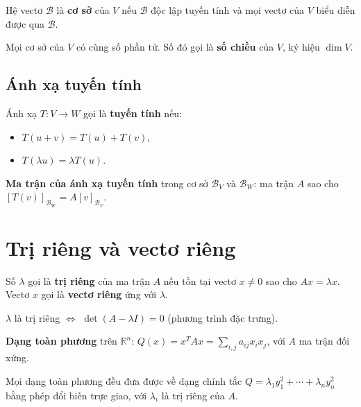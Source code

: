\documentclass[12pt,a4paper]{article}
\begin{document}
\begin{dinhnghia}
  Hệ vectơ $\mathcal{B}$ là \textbf{cơ sở} của $V$ nếu $\mathcal{B}$ độc lập tuyến tính và mọi vectơ của $V$ biểu diễn được qua $\mathcal{B}$.
\end{dinhnghia}

\begin{dinhly}
  Mọi cơ sở của $V$ có cùng số phần tử. Số đó gọi là \textbf{số chiều} của $V$, ký hiệu $\dim V$.
\end{dinhly}

\subsection{Ánh xạ tuyến tính}

\begin{dinhnghia}
  Ánh xạ $T: V \to W$ gọi là \textbf{tuyến tính} nếu:
  \begin{itemize}
    \item $T(u + v) = T(u) + T(v)$,
    \item $T(\lambda u) = \lambda T(u)$.
  \end{itemize}
\end{dinhnghia}

\begin{dinhnghia}
  \textbf{Ma trận của ánh xạ tuyến tính} trong cơ sở $\mathcal{B}_V$ và $\mathcal{B}_W$: ma trận $A$ sao cho $[T(v)]_{\mathcal{B}_W} = A [v]_{\mathcal{B}_V}$.
\end{dinhnghia}

\section{Trị riêng và vectơ riêng}

\begin{dinhnghia}
  Số $\lambda$ gọi là \textbf{trị riêng} của ma trận $A$ nếu tồn tại vectơ $x \ne 0$ sao cho $Ax = \lambda x$. Vectơ $x$ gọi là \textbf{vectơ riêng} ứng với $\lambda$.
\end{dinhnghia}

\begin{congthuc}
  $\lambda$ là trị riêng $\Leftrightarrow$ $\det(A - \lambda I) = 0$ (phương trình đặc trưng).
\end{congthuc}

\begin{dinhnghia}
  \textbf{Dạng toàn phương} trên $\mathbb{R}^n$: $Q(x) = x^T A x = \sum_{i,j} a_{ij} x_i x_j$, với $A$ ma trận đối xứng.
\end{dinhnghia}

\begin{dinhly}[title={Dạng chính tắc}]
  Mọi dạng toàn phương đều đưa được về dạng chính tắc $Q = \lambda_1 y_1^2 + \cdots + \lambda_n y_n^2$ bằng phép đổi biến trực giao, với $\lambda_i$ là trị riêng của $A$.
\end{dinhly}
\end{document}
